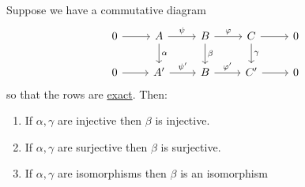 \begin{lemma}\label{lma:the-short-five-lemma}
	Suppose we have a commutative diagram
	\[
		\begin{tikzcd}
			0 & A & B & C & 0 \\
			0 & {A^\prime} & B & {C^\prime} & 0
			\arrow[from=1-1, to=1-2]
			\arrow["\psi", from=1-2, to=1-3]
			\arrow["\varphi", from=1-3, to=1-4]
			\arrow[from=1-4, to=1-5]
			\arrow["\gamma", from=1-4, to=2-4]
			\arrow[from=2-4, to=2-5]
			\arrow["{\varphi^\prime}", from=2-3, to=2-4]
			\arrow["\beta", from=1-3, to=2-3]
			\arrow["{\psi^\prime}", from=2-2, to=2-3]
			\arrow["\alpha", from=1-2, to=2-2]
			\arrow[from=2-1, to=2-2]
		\end{tikzcd}
	\]
	so that the rows are \hyperref[def:exact-sequence]{exact}. Then:
	\begin{enumerate}
		\item If \(\alpha, \gamma\) are injective then \(\beta\) is injective.
		\item If \(\alpha, \gamma\) are surjective then \(\beta\) is surjective.
		\item If \(\alpha, \gamma\) are isomorphisms then \(\beta\) is an isomorphism
	\end{enumerate}
\end{lemma}

